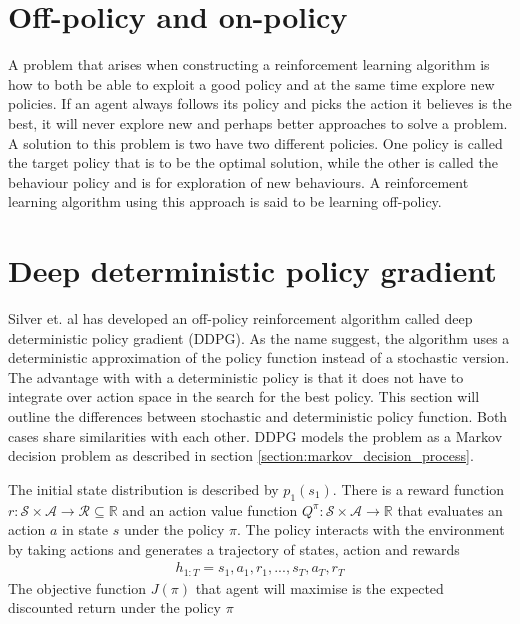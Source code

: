 \documentclass[class=book, crop=false]{standalone}
\begin{document}
\section{Off-policy and on-policy}
A problem that arises when constructing a reinforcement learning algorithm is how to both be able to exploit a good policy and at the same time explore new policies. If an agent always follows its policy and picks the action it believes is the best, it will never explore new and perhaps better approaches to solve a problem. A solution to this problem is two have two different policies. One policy is called the target policy that is to be the optimal solution, while the other is called the behaviour policy and is for exploration of new behaviours\cite{Sutton1998}. A reinforcement learning algorithm using this approach is said to be learning off-policy.

\section{Deep deterministic policy gradient}
Silver et. al has developed an off-policy reinforcement algorithm called deep deterministic policy gradient (DDPG)\cite{pmlr-v32-silver14}. As the name suggest, the algorithm uses a deterministic approximation of the policy function instead of a stochastic version. The advantage with with a deterministic policy is that it does not have to integrate over action space in the search for the best policy. This section will outline the differences between stochastic and deterministic policy function. Both cases share similarities with each other. DDPG models the problem as a Markov decision problem as described in section \ref{section:markov_decision_process}.

The initial state distribution is described by $p_{1}(s_{1})$. There is a reward function $r: \mathcal{S} \times \mathcal{A} \to \mathcal{R} \subseteq \mathbb{R}$ and an action value function $Q^{\pi}:\mathcal{S} \times \mathcal{A} \to \mathbb{R}$ that evaluates an action $a$ in state $s$ under the policy $\pi$. The policy interacts with the environment by taking actions and generates a trajectory of states, action and rewards 
\begin{equation}
   \begin{aligned}\label{eq:theory:trajectory2}
h_{1:T} = s_{1},a_{1},r_{1},..., s_{T},a_{T},r_{T}
\end{aligned} 
\end{equation}
The objective function $J(\pi)$ that agent will maximise is the expected discounted return under the policy $\pi$
\end{document}
